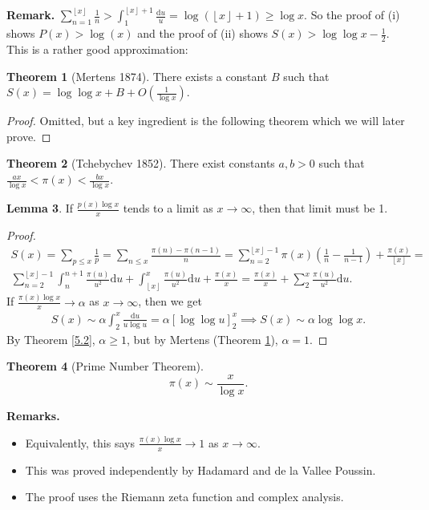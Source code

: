 \documentclass{article}
\theoremstyle{definition}
\newtheorem{theorem}{Theorem}[section]
\newtheorem{lemma}[theorem]{Lemma}
\begin{document}
\textbf{Remark.} $\sum_{n=1}^{\left\lfloor x \right\rfloor} \frac{1}{n} > \int_{1}^{\left\lfloor x \right\rfloor+1} \frac{\mathrm{d}u}{u} = \log(\left\lfloor x \right\rfloor+1) \ge \log x$. So the proof of (i) shows $P(x) > \log(x)$ and the proof of (ii) shows $S(x) > \log \log x - \frac{1}{2}$. This is a rather good approximation:
\begin{theorem}[Mertens 1874]\label{5.3}
    There exists a constant $B$ such that $S(x) = \log \log x + B + O(\frac{1}{\log x})$.
\end{theorem}
\begin{proof}
    Omitted, but a key ingredient is the following theorem which we will later prove.
\end{proof}
\begin{theorem}[Tchebychev 1852]
    There exist constants $a,b >0$ such that $\frac{ax}{\log x} < \pi(x) < \frac{bx}{\log x}$.
\end{theorem}
\begin{lemma}
    If $\frac{p(x) \log x}{x}$ tends to a limit as $x \to \infty$, then that limit must be 1.
\end{lemma}
\begin{proof}
    \begin{align*}
        S(x) = \sum_{p\le x}^{} \frac{1}{p} = \sum_{n\le x}^{} \frac{\pi(n)-\pi(n-1)}{n} = \sum_{n=2}^{\left\lfloor x \right\rfloor-1} \pi(x)\left(\frac{1}{n}-\frac{1}{n-1}\right) + \frac{\pi(x)}{\left\lfloor x \right\rfloor} = \\
        \sum_{n=2}^{\left\lfloor x \right\rfloor-1} \int_{n}^{n+1} \frac{\pi(u)}{u^2}\mathrm{d}u + \int_{\left\lfloor x \right\rfloor}^{x} \frac{\pi(u)}{u^2}\mathrm{d}u + \frac{\pi(x)}{x} = \frac{\pi(x)}{x} + \sum_{2}^{x} \frac{\pi(u)}{u^2}\mathrm{d}u.
    \end{align*}
    If $\frac{\pi(x)\log x}{x} \to \alpha$ as $x \to \infty$, then we get 
    \begin{align*}
        S(x) \sim \alpha \int_{2}^{x} \frac{\mathrm{d}u}{u \log u} = \alpha \left[\log \log u \right]_2^x \implies S(x) \sim \alpha \log \log x. 
    \end{align*}
    By Theorem \ref{5.2}, $\alpha\ge 1$, but by Mertens (Theorem \ref{5.3}), $\alpha=1$.
\end{proof}
\begin{theorem}[Prime Number Theorem]
    \[
    \pi(x) \sim \frac{x}{\log x}.
    \]
\end{theorem}
\textbf{Remarks.}
\begin{itemize}
    \item Equivalently, this says $\frac{\pi(x) \log x}{x} \to 1$ as $x \to \infty$.
    \item This was proved independently by Hadamard and de la Vallee Poussin.
    \item The proof uses the Riemann zeta function and complex analysis.
\end{itemize}
\end{document}
